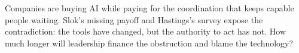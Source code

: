 Companies are buying AI while paying for the coordination that keeps
capable people waiting. Slok's missing payoff and Hastings's survey
expose the contradiction: the tools have changed, but the authority to
act has not. How much longer will leadership finance the obstruction and
blame the technology?
